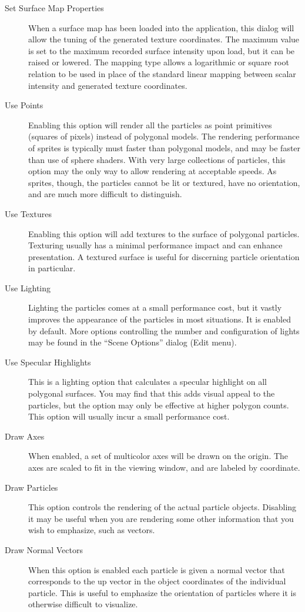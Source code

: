 \begin{description}
\item[Set Surface Map Properties]
     When a surface map has been loaded into the application, this dialog will allow the tuning of the generated texture coordinates.  The maximum value is set to the maximum recorded surface intensity upon load, but it can be raised or lowered.  The mapping type allows a logarithmic or square root relation to be used in place of the standard linear mapping between scalar intensity and generated texture coordinates.
\item[Use Points]
     Enabling this option will render all the particles as point primitives (squares of pixels) instead of polygonal models.  The rendering performance of sprites is typically must faster than polygonal models, and may be faster than use of sphere shaders.  With very large collections of particles, this option may the only way to allow rendering at acceptable speeds. As sprites, though, the particles cannot be lit or textured, have no orientation, and are much more difficult to distinguish.
\item[Use Textures]
     Enabling this option will add textures to the surface of polygonal particles. Texturing usually has a minimal performance impact and can enhance presentation. A textured surface is useful for discerning particle orientation in particular.
\item[Use Lighting]
Lighting the particles comes at a small performance cost, but it vastly improves the appearance of the particles in most situations.  It is enabled by default.  More options controlling the number and configuration of lights may be found in the ``Scene Options'' dialog (Edit menu).
\item[Use Specular Highlights]
This is a lighting option that calculates a specular highlight on all polygonal surfaces. You may find that this adds visual appeal to the particles, but the option may only be effective at higher polygon counts.  This option will usually incur a small performance cost.
\item[Draw Axes] When enabled, a set of multicolor axes will be drawn on the origin. The axes are scaled to fit in the viewing window, and are labeled by coordinate.
\item[Draw Particles]
    This option controls the rendering of the actual particle objects. Disabling it may be useful when you are rendering some other information that you wish to emphasize, such as vectors.
\item[Draw Normal Vectors]
    When this option is enabled each particle is given a normal vector that corresponds to the up vector in the object coordinates of the individual particle. This is useful to emphasize the orientation of particles where it is otherwise difficult to visualize.

\end{description}
